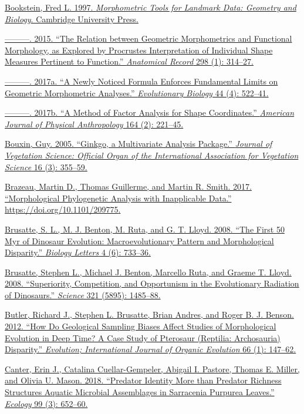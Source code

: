 \href{http://paperpile.com/b/sTGYvp/1SD2}{Bookstein, Fred L. 1997.
\emph{Morphometric Tools for Landmark Data: Geometry and Biology}.
Cambridge University Press.}

\href{http://paperpile.com/b/sTGYvp/sN5d}{---------. 2015. ``The
Relation between Geometric Morphometrics and Functional Morphology, as
Explored by Procrustes Interpretation of Individual Shape Measures
Pertinent to Function.'' \emph{Anatomical Record} 298 (1): 314--27.}

\href{http://paperpile.com/b/sTGYvp/o4w7}{---------. 2017a. ``A Newly
Noticed Formula Enforces Fundamental Limits on Geometric Morphometric
Analyses.'' \emph{Evolutionary Biology} 44 (4): 522--41.}

\href{http://paperpile.com/b/sTGYvp/xaUx}{---------. 2017b. ``A Method
of Factor Analysis for Shape Coordinates.'' \emph{American Journal of
Physical Anthropology} 164 (2): 221--45.}

\href{http://paperpile.com/b/sTGYvp/9JdS}{Bouxin, Guy. 2005. ``Ginkgo, a
Multivariate Analysis Package.'' \emph{Journal of Vegetation Science:
Official Organ of the International Association for Vegetation Science}
16 (3): 355--59.}

\href{http://paperpile.com/b/sTGYvp/Yrbg}{Brazeau, Martin D., Thomas
Guillerme, and Martin R. Smith. 2017. ``Morphological Phylogenetic
Analysis with Inapplicable Data.''
https://doi.org/}\href{http://dx.doi.org/10.1101/209775}{10.1101/209775}\href{http://paperpile.com/b/sTGYvp/Yrbg}{.}

\href{http://paperpile.com/b/sTGYvp/tGyd}{Brusatte, S. L., M. J. Benton,
M. Ruta, and G. T. Lloyd. 2008. ``The First 50 Myr of Dinosaur
Evolution: Macroevolutionary Pattern and Morphological Disparity.''
\emph{Biology Letters} 4 (6): 733--36.}

\href{http://paperpile.com/b/sTGYvp/EeC8}{Brusatte, Stephen L., Michael
J. Benton, Marcello Ruta, and Graeme T. Lloyd. 2008. ``Superiority,
Competition, and Opportunism in the Evolutionary Radiation of
Dinosaurs.'' \emph{Science} 321 (5895): 1485--88.}

\href{http://paperpile.com/b/sTGYvp/aSSL}{Butler, Richard J., Stephen L.
Brusatte, Brian Andres, and Roger B. J. Benson. 2012. ``How Do
Geological Sampling Biases Affect Studies of Morphological Evolution in
Deep Time? A Case Study of Pterosaur (Reptilia: Archosauria)
Disparity.'' \emph{Evolution; International Journal of Organic
Evolution} 66 (1): 147--62.}

\href{http://paperpile.com/b/sTGYvp/60H0}{Canter, Erin J., Catalina
Cuellar-Gempeler, Abigail I. Pastore, Thomas E. Miller, and Olivia U.
Mason. 2018. ``Predator Identity More than Predator Richness Structures
Aquatic Microbial Assemblages in Sarracenia Purpurea Leaves.''
\emph{Ecology} 99 (3): 652--60.}

